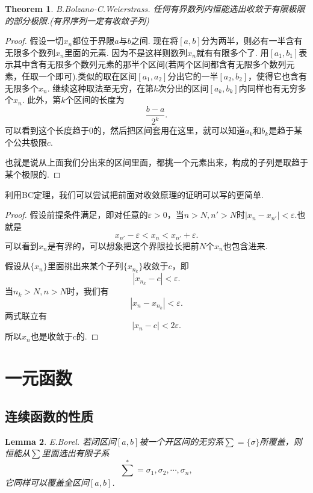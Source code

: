 \documentclass{article}
\newtheorem{theorem}{Theorem}[section]
\newtheorem{lemma}[theorem]{Lemma}
\begin{document}
\begin{theorem}
B.Bolzano-C.Weierstrass. 任何有界数列内恒能选出收敛于有限极限的部分极限.(有界序列一定有收敛子列)
\end{theorem}

\begin{proof}
假设一切$x_n$都位于界限$a$与$b$之间. 现在将$[a,b]$分为两半，则必有一半含有无限多个数列$x_n$里面的元素. 因为不是这样则数列$x_n$就有有限多个了. 用$[a_1,b_1]$表示其中含有无限多个数列元素的那半个区间(若两个区间都含有无限多个数列元素，任取一个即可).类似的取在区间$[a_1,a_2]$分出它的一半$[a_2,b_2]$，使得它也含有无限多个$x_n$. 继续这种取法至无穷，在第$k$次分出的区间$[a_k,b_k]$内同样也有无穷多个$x_n$. 此外，第$k$个区间的长度为\[\frac{b-a}{2^k}.\]可以看到这个长度趋于$0$的，然后把区间套用在这里，就可以知道$a_k$和$b_k$是趋于某个公共极限$c$.

也就是说从上面我们分出来的区间里面，都挑一个元素出来，构成的子列是取趋于某个极限的.
\end{proof}

利用BC定理，我们可以尝试把前面对收敛原理的证明可以写的更简单.

\begin{proof}
假设前提条件满足，即对任意的$\varepsilon > 0$，当$n > N,n'>N$时$|x_n-x_{n'}|< \varepsilon$.也就是\[ x_{n'} -\varepsilon < x_n < x_{n'} + \varepsilon.\]可以看到$x_n$是有界的，可以想象把这个界限拉长把前$N$个$x_n$也包含进来.

假设从$\{x_n\}$里面挑出来某个子列$\{x_{n_k}\}$收敛于$c$，即\[|x_{n_k} -c| < \varepsilon.\]当$n_k > N,n > N$时，我们有\[|x_n - x_{n_k}| < \varepsilon.\]两式联立有\[|x_n - c| < 2\varepsilon.\]所以$x_n$也是收敛于$c$的.
\end{proof}



\newpage
\section{一元函数}
\subsection{连续函数的性质}

\begin{lemma}
\rm E.Borel. 若闭区间$[a,b]$被一个开区间的无穷系$\sum = \{\sigma\}$所覆盖，则恒能从$\sum$里面选出有限子系\[\sum^{*} = {\sigma_1,\sigma_2,\cdots,\sigma_n},\]它同样可以覆盖全区间$[a,b]$.
\end{lemma}
\end{document}
